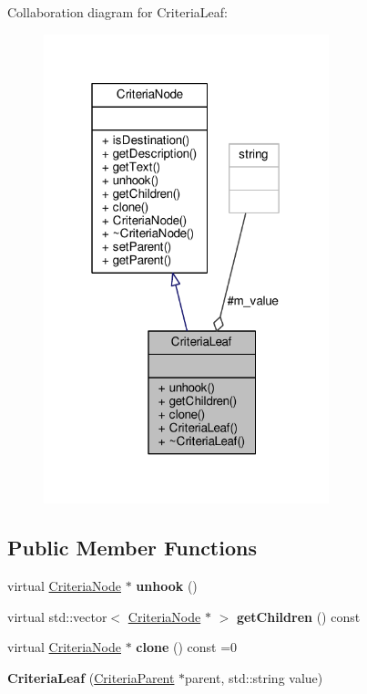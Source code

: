 Collaboration diagram for Criteria\+Leaf\+:
\nopagebreak
\begin{figure}[H]
\begin{center}
\leavevmode
\includegraphics[width=235pt]{d7/d25/classCriteriaLeaf__coll__graph}
\end{center}
\end{figure}
\subsection*{Public Member Functions}
\begin{DoxyCompactItemize}
\item 
virtual \hyperlink{classCriteriaNode}{Criteria\+Node} $\ast$ {\bfseries unhook} ()\hypertarget{classCriteriaLeaf_ad5e92988b7a7e4f60877a5439a1a1694}{}\label{classCriteriaLeaf_ad5e92988b7a7e4f60877a5439a1a1694}

\item 
virtual std\+::vector$<$ \hyperlink{classCriteriaNode}{Criteria\+Node} $\ast$ $>$ {\bfseries get\+Children} () const \hypertarget{classCriteriaLeaf_a7d07de8dee6a910b801d85d7ad789b8e}{}\label{classCriteriaLeaf_a7d07de8dee6a910b801d85d7ad789b8e}

\item 
virtual \hyperlink{classCriteriaNode}{Criteria\+Node} $\ast$ {\bfseries clone} () const =0\hypertarget{classCriteriaLeaf_aeb450f2738b9b15534e3394a755bf8d6}{}\label{classCriteriaLeaf_aeb450f2738b9b15534e3394a755bf8d6}

\item 
{\bfseries Criteria\+Leaf} (\hyperlink{classCriteriaParent}{Criteria\+Parent} $\ast$parent, std\+::string value)\hypertarget{classCriteriaLeaf_a27666ecb4e068938a5c0abd8da6ebf75}{}\label{classCriteriaLeaf_a27666ecb4e068938a5c0abd8da6ebf75}

\end{DoxyCompactItemize}
